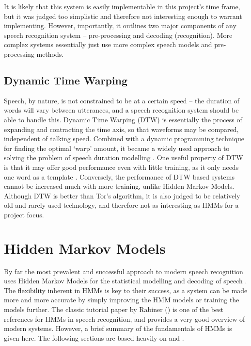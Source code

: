 		It is likely that this system is easily implementable in this project's time frame, but it was judged too simplistic and therefore not interesting enough to warrant implementing.  However, importantly, it outlines two major components of any speech recognition system -- pre-processing and decoding (recognition).  More complex systems essentially just use more complex speech models and pre-processing methods.

	\subsection{Dynamic Time Warping} %
		\label{sub:dynamic_time_warping}
		Speech, by nature, is not constrained to be at a certain speed -- the duration of words will vary between utterances, and a speech recognition system should be able to handle this.  Dynamic Time Warping (DTW)  is essentially the process of expanding and contracting the time axis, so that waveforms may be compared, independent of talking speed.  Combined with a dynamic programming technique for finding the optimal `warp' amount, it became a widely used approach to solving the problem of speech duration modelling \cite{furui1989speech}.  One useful property of DTW is that it may offer good performance even with little training, as it only needs one word as a template \cite{melnikoff2003speech}.  Conversely, the performance of DTW based systems cannot be increased much with more training, unlike Hidden Markov Models.
		Although DTW is better than Tor's algorithm, it is also judged to be relatively old and rarely used technology, and therefore not as interesting as HMMs for a project focus.


\section{Hidden Markov Models} %
\label{sec:about_hmms}
	By far the most prevalent and successful approach to modern speech recognition uses Hidden Markov Models for the statistical modelling and decoding of speech \cite{cox1988hidden}.  The flexibility inherent in HMMs is key to their success, as a system can be made more and more accurate by simply improving the HMM models or training the models further.  The classic tutorial paper by Rabiner (\cite{rabiner1989tutorial}) is one of the best references for HMMs in speech recognition, and provides a very good overview of modern systems.  However, a brief summary of the fundamentals of HMMs is given here. The following sections are based heavily on \cite{rabiner1989tutorial} and \cite{htkbook}.

